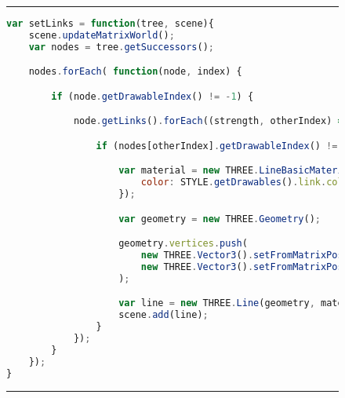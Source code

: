 \begin{figure}[H]
\noindent\rule{\textwidth}{1pt}
\begin{lstlisting}[language=JavaScript, caption= {Linking function of calls}, label={lst:callLinks}]
var setLinks = function(tree, scene){
    scene.updateMatrixWorld();
    var nodes = tree.getSuccessors();

    nodes.forEach( function(node, index) {

        if (node.getDrawableIndex() != -1) {

            node.getLinks().forEach((strength, otherIndex) => {

                if (nodes[otherIndex].getDrawableIndex() != -1) {

                    var material = new THREE.LineBasicMaterial({
                        color: STYLE.getDrawables().link.color
                    });

                    var geometry = new THREE.Geometry();

                    geometry.vertices.push(
                        new THREE.Vector3().setFromMatrixPosition(drawables.get(node.getType())[node.getDrawableIndex()].getMesh().matrixWorld),
                        new THREE.Vector3().setFromMatrixPosition(drawables.get(nodes[otherIndex].getType())[nodes[otherIndex].getDrawableIndex()].getMesh().matrixWorld)
                    );

                    var line = new THREE.Line(geometry, material);
                    scene.add(line);
                }
            });
        }
    });
}
\end{lstlisting}
\noindent\rule{\textwidth}{1pt}
\end{figure}